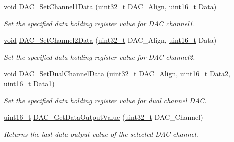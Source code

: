 \begin{DoxyCompactItemize}
\hyperlink{usb__devapi_8h_afabf60e7f57651d6d595a02c75f07cd0}{void} \hyperlink{group___d_a_c___exported___functions_gad06b4230d2b17d1d13f41dce4c782461}{D\+A\+C\+\_\+\+Set\+Channel1\+Data} (\hyperlink{_p_e___types_8h_a33594304e786b158f3fb30289278f5af}{uint32\+\_\+t} D\+A\+C\+\_\+\+Align, \hyperlink{_p_e___types_8h_a1f1825b69244eb3ad2c7165ddc99c956}{uint16\+\_\+t} Data)
\begin{DoxyCompactList}\small\item\em Set the specified data holding register value for D\+AC channel1. \end{DoxyCompactList}\item 
\hyperlink{usb__devapi_8h_afabf60e7f57651d6d595a02c75f07cd0}{void} \hyperlink{group___d_a_c___exported___functions_ga44e12006ec186791378d132da8541552}{D\+A\+C\+\_\+\+Set\+Channel2\+Data} (\hyperlink{_p_e___types_8h_a33594304e786b158f3fb30289278f5af}{uint32\+\_\+t} D\+A\+C\+\_\+\+Align, \hyperlink{_p_e___types_8h_a1f1825b69244eb3ad2c7165ddc99c956}{uint16\+\_\+t} Data)
\begin{DoxyCompactList}\small\item\em Set the specified data holding register value for D\+AC channel2. \end{DoxyCompactList}\item 
\hyperlink{usb__devapi_8h_afabf60e7f57651d6d595a02c75f07cd0}{void} \hyperlink{group___d_a_c___exported___functions_ga4ca2cfdf56ab35a23f2517f23d7fbb24}{D\+A\+C\+\_\+\+Set\+Dual\+Channel\+Data} (\hyperlink{_p_e___types_8h_a33594304e786b158f3fb30289278f5af}{uint32\+\_\+t} D\+A\+C\+\_\+\+Align, \hyperlink{_p_e___types_8h_a1f1825b69244eb3ad2c7165ddc99c956}{uint16\+\_\+t} Data2, \hyperlink{_p_e___types_8h_a1f1825b69244eb3ad2c7165ddc99c956}{uint16\+\_\+t} Data1)
\begin{DoxyCompactList}\small\item\em Set the specified data holding register value for dual channel D\+AC. \end{DoxyCompactList}\item 
\hyperlink{_p_e___types_8h_a1f1825b69244eb3ad2c7165ddc99c956}{uint16\+\_\+t} \hyperlink{group___d_a_c___exported___functions_ga51274838de1e5dd012a82d7f44d7a50b}{D\+A\+C\+\_\+\+Get\+Data\+Output\+Value} (\hyperlink{_p_e___types_8h_a33594304e786b158f3fb30289278f5af}{uint32\+\_\+t} D\+A\+C\+\_\+\+Channel)
\begin{DoxyCompactList}\small\item\em Returns the last data output value of the selected D\+AC channel. \end{DoxyCompactList}\end{DoxyCompactItemize}
